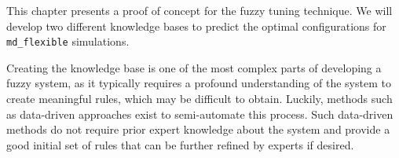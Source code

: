 \newcommand{\crispTreeNode}[2]{
    \begin{tikzpicture}
        \begin{axis}%
            [
                title = {Crisp Split: $#1 \leq #2$},
                width=4.5cm,
                height=3cm,
                axis lines=center,
                xlabel={#1},
                x label style={at={(axis description cs:0.9,-0.1)},anchor=north},
                ylabel=$\mu$,
                y label style={at={(axis description cs:0.5,1)},anchor=south},
                xmin=-5,
                xmax=5,
                xtick={},
                xticklabels= {},
                ytick={},
                yticklabels={},
                extra x ticks={0},
                extra x tick labels={#2},
                ymin=-0.1,
                ymax=1.1,
                samples=50,
                extra y ticks={1},
                every axis plot/.append style={thick}
            ]
            \addplot[red,domain=-5:-0.6] {step(x,0,-1)};
            \addplot[blue,domain=0.6:5] {step(x,0,1)};
            \addplot[red,domain=0.6:5] {step(x,0,-1)};
            \addplot[blue,domain=-5:-0.6] {step(x,0,1)};

            \node[draw,draw=black,circle,inner sep=1pt,minimum width=3pt,thick] at (axis cs:0,1) {};
            \node[draw,draw=black,circle,inner sep=1pt,minimum width=3pt,thick] at (axis cs:0,0) {};

            \node[anchor=center, red] at (axis cs:-2.9,0.6) {$#1 \leq #2$};
            \node[anchor=center, blue] at (axis cs:3.1,0.6) {$#1 > #2$};
        \end{axis}

    \end{tikzpicture}
}



This chapter presents a proof of concept for the fuzzy tuning technique. We will develop two different knowledge bases to predict the optimal configurations for \texttt{md\_flexible} simulations.

Creating the knowledge base is one of the most complex parts of developing a fuzzy system, as it typically requires a profound understanding of the system to create meaningful rules, which may be difficult to obtain. Luckily, methods such as data-driven approaches exist to semi-automate this process. Such data-driven methods do not require prior expert knowledge about the system and provide a good initial set of rules that can be further refined by experts if desired.

